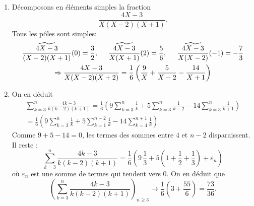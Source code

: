 \begin{enumerate}
\item  D{\'e}composons en {\'e}l{\'e}ments simples la fraction 
\begin{displaymath}
\frac{4X-3}{X(X-2)(X+1)} .
\end{displaymath}
Tous les pôles sont simples:
\begin{multline*}
 \widetilde{\frac{4X-3}{(X-2)(X+1)}}(0) = \frac{3}{2},\hspace{0.5cm}
 \widetilde{\frac{4X-3}{X(X+1)}}(2) = \frac{5}{6}, \hspace{0.5cm}
 \widetilde{\frac{4X-3}{X(X-2)}}(-1) = -\frac{7}{3} \\
 \Rightarrow
\frac{4X-3}{X(X-2)(X+2)}=\frac{1}{6}\left( \frac{9}{X} + \frac{5}{X-2} - \frac{14}{X+1} \right)
\end{multline*}
\item On en d{\'e}duit
\begin{multline*}
\sum_{k=3}^{n}\frac{4k-3}{k(k-2)(k+1)} 
= \frac{1}{6}\left( 9\sum_{k=3}^{n}\frac{1}{k} + 5\sum_{k=3}^{n}\frac{1}{k-2} - 14\sum_{k=3}^{n}\frac{1}{k+1}\right)
\\
= \frac{1}{6}\left( 9\sum_{k=3}^{n}\frac{1}{k} + 5\sum_{k=1}^{n-2}\frac{1}{k} - 14\sum_{k=4}^{n+1}\frac{1}{k}\right)
\end{multline*}
Comme $9+ 5 - 14 = 0$, les termes des sommes entre $4$ et $n-2$ disparaissent. Il reste :
\[
\sum_{k=3}^{n}\frac{4k-3}{k(k-2)(k+1)}
= \frac{1}{6}\left( 9 \,\frac{1}{3} + 5(1+\frac{1}{2}+\frac{1}{3}) + \varepsilon_{n}\right)
\]
o{\`u} $\varepsilon _{n}$ est une somme de termes qui tendent vers 0. On en d{\'e}duit que
\[
\left( \sum_{k=3}^{n}\frac{4k-3}{k(k-2)(k+1)}\right)_{n \geq 3} \rightarrow 
\frac{1}{6}\left( 3 + \frac{55}{6}\right) 
=\frac{73}{36}.
\]
\end{enumerate}
